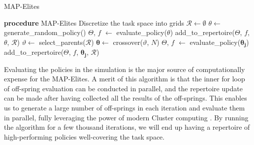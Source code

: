 \documentclass[journal]{IEEEtran}
\begin{document}
\begin{algorithm}
\caption{MAP-Elites}
\begin{algorithmic}
\STATE \textbf{procedure} MAP-Elites
\STATE Discretize the task space into grids
\STATE $\mathcal{R} \leftarrow \emptyset$ 
\STATE $\theta \leftarrow $ generate{\_}random{\_}policy()
\STATE $\Theta$, $f$ $\leftarrow$ evaluate{\_}policy($\theta$) 
\STATE add{\_}to{\_}repertoire($\Theta$, $f$, $\theta$, $\mathcal{R}$) 
\ENDFOR
{}
\STATE $\vartheta \leftarrow$ select{\_}parents($\mathcal{R}$)
\STATE $\bm{\theta} \leftarrow$ crossover($\vartheta$, $N$) 
\STATE $\Theta$, $f$ $\leftarrow$ evaluate{\_}policy($\bm{\theta_j}$)
\STATE add{\_}to{\_}repertoire($\Theta$, $f$, $\bm{\theta_j}$, $\mathcal{R}$)
\ENDFOR
\ENDFOR
\end{algorithmic}
\end{algorithm}
\noindent
Evaluating the policies in the simulation is the major source of computationally expense for the MAP-Elites.
A merit of this algorithm is that the inner for loop of off-spring evaluation can be conducted in parallel, and the repertoire update can be made after having collected all the results of the off-springs.
This enables us to generate a large number of off-springs in each iteration and evaluate them in parallel, fully leveraging the power of modern Cluster computing \cite{Q-Dax}.
By running the algorithm for a few thousand iterations, we will end up having a repertoire of high-performing policies well-covering the task space.
\end{document}
